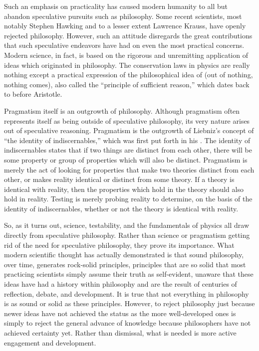 Such an emphasis on practicality has caused modern humanity to all but abandon speculative pursuits such as philosophy.  
Some recent scientists, most notably Stephen Hawking and to a lesser extent Lawrence Krauss, have openly rejected philosophy.\citep{warman2011}\citep{andersen2012}  
However, such an attitude disregards the great contributions that such speculative endeavors have had on even the most practical concerns.  Modern science, in fact, is based on the rigorous and unremitting application of ideas which originated in philosophy.  The conservation laws in physics are really nothing except a practical expression of the philosophical idea of  (out of nothing, nothing comes), also called the ``principle of sufficient reason,'' which dates back to before Aristotle.\citep{psr2011}

Pragmatism itself is an outgrowth of philosophy.  Although pragmatism often represents itself as being outside of speculative philosophy,  its very nature arises out of speculative reasoning.  Pragmatism is the outgrowth of Liebniz's concept of ``the identity of indiscernables,'' which was first put forth in his .\citep{ident2012}  The identity of indiscernables states that if two things are distinct from each other, there will be some property or group of properties which will also be distinct.  Pragmatism is merely the act of looking for properties that make two theories distinct from each other, or makes reality identical or distinct from some theory.  If a theory is identical with reality, then the properties which hold in the theory should also hold in reality.  Testing is merely probing reality to determine, on the basis of the identity of indiscernables, whether or not the theory is identical with reality.

So, as it turns out, science, testability, and the fundamentals of physics all draw directly from speculative philosophy.  Rather than science or pragmatism getting rid of the need for speculative philosophy, they prove its importance.  What modern scientific thought has actually demonstrated is that sound philosophy, over time, generates rock-solid principles, principles that are so solid that most practicing scientists simply assume their truth as self-evident, unaware that these ideas have had a history within philosophy and are the result of centuries of reflection, debate, and development.  It is true that not everything in philosophy is as sound or solid as these principles.  However, to reject philosophy just because newer ideas have not achieved the status as the more well-developed ones is simply to reject the general advance of knowledge because philosophers have not achieved certainty yet.  Rather than dismissal, what is needed is more active engagement and development.

